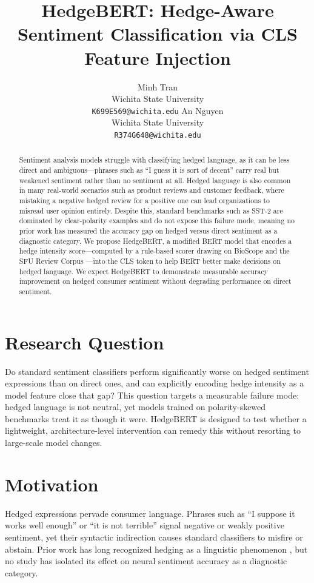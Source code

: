 \documentclass[11pt]{article}
\title{HedgeBERT: Hedge-Aware Sentiment Classification via CLS Feature Injection}
\author{
  Minh Tran\\
  Wichita State University \\
  \texttt{K699E569@wichita.edu}
  \And
  An Nguyen \\
  Wichita State University \\
  \texttt{R374G648@wichita.edu}
}
\begin{document}
\maketitle

\begin{abstract}
Sentiment analysis models struggle with classifying hedged language, as it can be
less direct and ambiguous---phrases such as ``I guess it is sort of decent'' carry
real but weakened sentiment rather than no sentiment at all. Hedged language is also
common in many real-world scenarios such as product reviews and customer feedback,
where mistaking a negative hedged review for a positive one can lead organizations
to misread user opinion entirely. Despite this, standard benchmarks such as SST-2
\cite{socher2013recursive} are dominated by clear-polarity examples and do not
expose this failure mode, meaning no prior work has measured the accuracy gap on
hedged versus direct sentiment as a diagnostic category. We propose HedgeBERT, a
modified BERT model that encodes a hedge intensity score---computed by a rule-based
scorer drawing on BioScope \cite{vincze2008bioscope} and the SFU Review Corpus
\cite{konstantinova2012sfu}---into the CLS token to help BERT better make decisions
on hedged language. We expect HedgeBERT to demonstrate measurable accuracy
improvement on hedged consumer sentiment without degrading performance on direct
sentiment.
\end{abstract}

\section{Research Question}

Do standard sentiment classifiers perform significantly worse on hedged sentiment
expressions than on direct ones, and can explicitly encoding hedge intensity as a
model feature close that gap? This question targets a measurable failure mode: 
hedged language is not neutral, yet models trained on polarity-skewed
benchmarks treat it as though it were. HedgeBERT is designed to test whether a
lightweight, architecture-level intervention can remedy this without resorting to
large-scale model changes.

\section{Motivation}

Hedged expressions pervade consumer language. Phrases such as ``I suppose it works
well enough'' or ``it is not terrible'' signal negative or weakly positive sentiment,
yet their syntactic indirection causes standard classifiers to misfire or abstain.
Prior work has long recognized hedging as a linguistic phenomenon
\cite{taboada2011lexicon, vincze2008bioscope}, but no study has isolated its effect
on neural sentiment accuracy as a diagnostic category.
\end{document}
